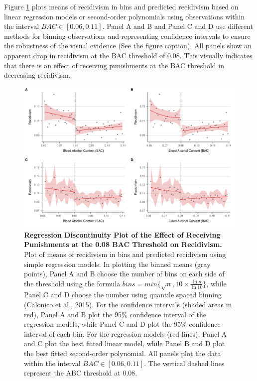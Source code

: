 \documentclass[
  11pt,
]{article}
\begin{document}
\endgroup

Figure \ref{fig:rdplot} plots means of recidivism in bins and predicted
recidivism based on linear regression models or second-order polynomials
using observations within the interval \(BAC \in [0.06, 0.11]\). Panel A
and B and Panel C and D use different methods for binning observations
and representing confidence intervals to ensure the robustness of the
visual evidence (See the figure caption). All panels show an apparent
drop in recidivism at the BAC threshold of 0.08. This visually indicates
that there is an effect of receiving punishments at the BAC threshold in
decreasing recidivism.

\begin{figure}[H]
  \centering
  \includegraphics[width=1\columnwidth]{../figures/combined.pdf}
  \caption{\textbf{Regression Discontinuity Plot of the Effect of Receiving Punishments at the 0.08 BAC Threshold on Recidivism.} Plot of means of recidivism in bins and predicted recidivism using simple regression models. In plotting the binned means (gray points), Panel A and B choose the number of bins on each side of the threshold using the formula $bins = min\{\sqrt{n}, 10 \times \frac{\ln{n}}{\ln{10}}\}$, while Panel C and D choose the number using quantile spaced binning (Calonico et al., 2015). For the confidence intervals (shaded areas in red), Panel A and B plot the 95\% confidence interval of the regression models, while Panel C and D plot the 95\% confidence interval of each bin. For the regression models (red lines), Panel A and C plot the best fitted linear model, while Panel B and D plot the best fitted second-order polynomial. All panels plot the data within the interval $BAC \in [0.06, 0.11]$. The vertical dashed lines represent the ABC threshold at 0.08.}
  \label{fig:rdplot}
\end{figure}
\end{document}
